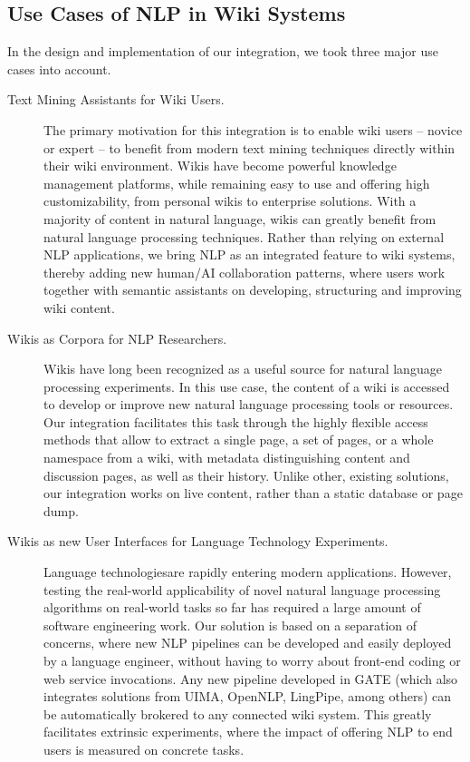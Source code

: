 \subsection{Use Cases of NLP in Wiki Systems}
In the design and implementation of our \wikinlp integration, we took three major use cases into account.

\begin{description}
\item[Text Mining Assistants for Wiki Users.] The primary motivation for this integration is to enable wiki users -- novice or expert -- to benefit from modern text mining techniques directly within their wiki environment. Wikis have become powerful knowledge management platforms, while remaining easy to use and offering high customizability, from personal wikis to enterprise solutions. With a majority of content in natural language, wikis can greatly benefit from natural language processing techniques. Rather than relying on external NLP applications, we bring NLP as an integrated feature to wiki systems, thereby adding new human/AI collaboration patterns, where users work together with semantic assistants on developing, structuring and improving wiki content.

\item[Wikis as Corpora for NLP Researchers.] Wikis have long been recognized as a useful source for natural language processing experiments. In this use case, the content of a wiki is accessed to develop or improve new natural language processing tools or resources. Our integration facilitates this task through the highly flexible access methods that allow to extract a single page, a set of pages, or a whole namespace from a wiki, with metadata distinguishing content and discussion pages, as well as their history. Unlike other, existing solutions, our \wikinlp integration works on live content, rather than a static database or page dump.

\item[Wikis as new User Interfaces for Language Technology Experiments.~~] Language technologies\linebreak are rapidly entering modern applications. However, testing the real-world applicability of novel natural language processing algorithms on real-world tasks so far has required a large amount of software engineering work. Our solution is based on a separation of concerns, where new NLP pipelines can be developed and easily deployed by a language engineer, without having to worry about front-end coding or web service invocations. Any new pipeline developed in GATE (which also integrates solutions from UIMA, OpenNLP, LingPipe, among others) can be automatically brokered to any connected wiki system. This greatly facilitates extrinsic experiments, where the impact of offering NLP to end users is measured on concrete tasks.
\end{description}

